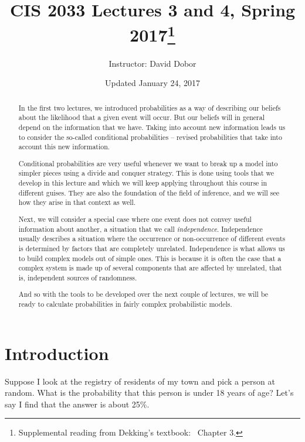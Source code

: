 \documentclass{tufte-handout}
\title{CIS 2033 Lectures 3 and 4, Spring  2017\thanks{Supplemental reading from Dekking's textbook: \ Chapter 3.}}
\author[David Dobor]{Instructor: David Dobor}
\date{Updated January 24, 2017} %
\begin{document}
\maketitle%

\begin{abstract}
\noindent
In the first two lectures, we introduced probabilities as a way of describing our beliefs
about the likelihood that a given event will occur. But our beliefs will in general depend 
on the information that we have. Taking into account new information leads us to consider 
the so-called conditional probabilities -- revised probabilities that take into account 
this new information.

Conditional probabilities are very useful whenever we want to break up a model into simpler
pieces using a divide and conquer strategy. This is done using tools that we develop in this lecture
and which we will keep applying throughout this course in different guises. They are also the 
foundation of the field of inference, and we will see how they arise in that context as well.

Next, we will consider a special case where one event does not convey useful information about 
another, a situation that we call \emph{independence}. Independence usually describes
a situation where the occurrence or non-occurrence of different events is determined by factors 
that are completely unrelated. Independence is what allows us to build complex models out of 
simple ones. This is because it is often the case that a complex system is made up of several components
that are affected by unrelated, that is, independent sources of randomness.

And so with the tools to be developed over the next couple of lectures, we will be ready to calculate
probabilities in fairly complex probabilistic models.


\end{abstract}


\section{Introduction}\label{sec:intro}

Suppose I look at the registry of residents of my town and pick a person at random. What is the probability that this person is under 18 years of age? Let's say I find that the answer is about 25\%.
\end{document}
